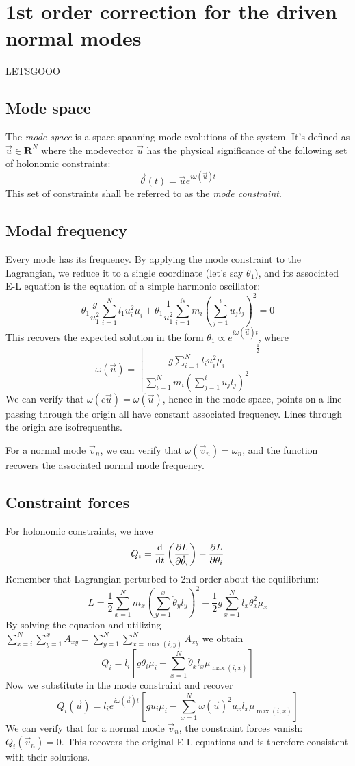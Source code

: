 \documentclass[12pt]{article}
\begin{document}
	\section{1st order correction for the driven normal modes}
	
	LETSGOOO
	
	\subsection{Mode space}
	The \textit{mode space} is a space spanning mode evolutions of the system. It's defined as $\vec{u}\in \mathbf{R}^N$ where the modevector $\vec{u}$ has the physical significance of the following set of holonomic constraints:
	$$\vec{\theta}(t)=\vec{u}e^{i\omega(\vec{u})t}$$
	This set of constraints shall be referred to as the \textit{mode constraint}.
	
	\subsection{Modal frequency}
	Every mode has its frequency. By applying the mode constraint to the Lagrangian, we reduce it to a single coordinate (let's say $\theta_1$), and its associated E-L equation is the equation of a simple harmonic oscillator:
	$$\theta_1 \frac{g}{u_1^2}\sum_{i=1}^N l_1 u_i^2 \mu_i + \ddot{\theta}_1 \frac{1}{u_1^2}\sum_{i=1}^N m_i\left(\sum_{j=1}^i u_j l_j\right)^2=0$$
	This recovers the expected solution in the form $\theta_1 \propto e^{i\omega(\vec{u})t}$, where
	$$\omega(\vec{u})=\left[\frac{g\sum\limits_{i=1}^N l_i u_i^2 \mu_i}{\sum\limits_{i=1}^N m_i\left(\sum\limits_{j=1}^i u_j l_j\right)^2}\right]^\frac{1}{2}$$
	We can verify that $\omega(c\vec{u})=\omega(\vec{u})$, hence in the mode space, points on a line passing through the origin all have constant associated frequency. Lines through the origin are isofrequenths.
	
	For a normal mode $\vec{v}_n$, we can verify that $\omega(\vec{v}_n)=\omega_n$, and the function recovers the associated normal mode frequency.
	
	\subsection{Constraint forces}
	For holonomic constraints, we have
	$$Q_i=\dv{}{t}\left(\pdv{L}{\dot{\theta}_i}\right)-\pdv{L}{\theta_i}$$
	Remember that Lagrangian perturbed to 2nd order about the equilibrium:
	$$L=\frac{1}{2}\sum\limits_{x=1}^N m_x\left(\sum_{y=1}^x \dot{\theta}_y l_y\right)^2-\frac{1}{2}g\sum_{x=1}^N l_x \theta_x^2 \mu_x$$
	By solving the equation and utilizing $\sum\limits_{x=i}^N\sum\limits_{y=1}^x A_{xy}=\sum\limits_{y=1}^N\sum\limits_{x=\max(i,y)}^N A_{xy}$ we obtain
	$$Q_i = l_i\left[ g\theta_i\mu_i + \sum_{x=1}^N \ddot{\theta}_x l_x \mu_{\max(i,x)} \right]$$
	Now we substitute in the mode constraint and recover
	$$Q_i(\vec{u}) = l_i e^{i\omega(\vec{u})t}\left[ g u_i\mu_i - \sum_{x=1}^N \omega(\vec{u})^2 u_x l_x \mu_{\max(i,x)} \right]$$
	We can verify that for a normal mode $\vec{v}_n$, the constraint forces vanish: $Q_i(\vec{v}_n)=0$. This recovers the original E-L equations and is therefore consistent with their solutions.
	
\end{document}
